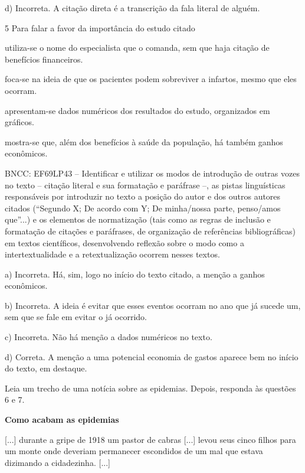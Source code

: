 \begin{escolha}
\begin{escolha}
\begin{escolha}
\begin{escolha}
\begin{escolha}
d) Incorreta. A citação direta é a transcrição da fala literal de
alguém.

\num {5} Para falar a favor da importância do estudo citado

\begin{escolha}
\item utiliza-se o nome do especialista que o comanda, sem que haja
citação de benefícios financeiros.

\item foca-se na ideia de que os pacientes podem sobreviver a infartos,
mesmo que eles ocorram.

\item apresentam-se dados numéricos dos resultados do estudo, organizados
em gráficos.

\item mostra-se que, além dos benefícios à saúde da população, há também
ganhos econômicos.
\end{escolha}

BNCC: EF69LP43 -- Identificar e utilizar os modos de introdução de
outras vozes no texto -- citação literal e sua formatação e paráfrase
--, as pistas linguísticas responsáveis por introduzir no texto a
posição do autor e dos outros autores citados (``Segundo X; De acordo
com Y; De minha/nossa parte, penso/amos que''...) e os elementos de
normatização (tais como as regras de inclusão e formatação de citações e
paráfrases, de organização de referências bibliográficas) em textos
científicos, desenvolvendo reflexão sobre o modo como a
intertextualidade e a retextualização ocorrem nesses textos.

a) Incorreta. Há, sim, logo no início do texto citado, a menção a ganhos
econômicos.

b) Incorreta. A ideia é evitar que esses eventos ocorram no ano que já
sucede um, sem que se fale em evitar o já ocorrido.

c) Incorreta. Não há menção a dados numéricos no texto.

d) Correta. A menção a uma potencial economia de gastos aparece bem no
início do texto, em destaque.

Leia um trecho de uma notícia sobre as epidemias. Depois, responda às
questões 6 e 7.

\textbf{Como acabam as epidemias}

{[}...{]} durante a gripe de 1918 um pastor de cabras {[}...{]} levou
seus cinco filhos para um monte onde deveriam permanecer escondidos de
um mal que estava dizimando a cidadezinha. {[}...{]}


\end{escolha}
\end{escolha}
\end{escolha}
\end{escolha}
\end{escolha}
